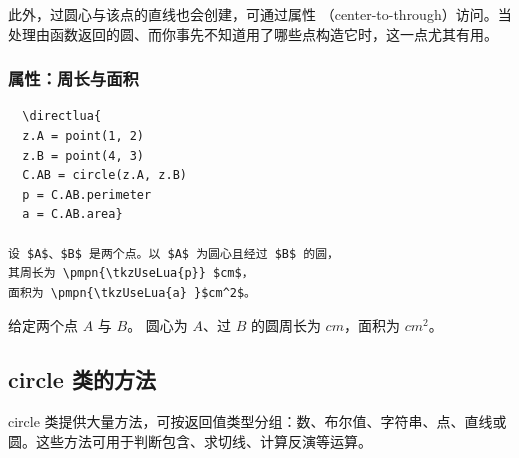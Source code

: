 \medskip

此外，过圆心与该点的直线也会创建，可通过属性 （center-to-through）访问。当处理由函数返回的圆、而你事先不知道用了哪些点构造它时，这一点尤其有用。

\vspace{1em}

\begin{tkzexample}[latex=7cm]
\begin{center}
\end{center}
\end{tkzexample}


\subsubsection{属性：周长与面积}
\label{ssub:attributes_perimeter_and_area}

 \let\pmpn\pgfmathprintnumber

\begin{mybox}
\begin{verbatim}
  \directlua{
  z.A = point(1, 2)
  z.B = point(4, 3)
  C.AB = circle(z.A, z.B)
  p = C.AB.perimeter
  a = C.AB.area}

设 $A$、$B$ 是两个点。以 $A$ 为圆心且经过 $B$ 的圆，
其周长为 \pmpn{\tkzUseLua{p}} $cm$，
面积为 \pmpn{\tkzUseLua{a} }$cm^2$。
\end{verbatim}
\end{mybox}


给定两个点 $A$ 与 $B$。
圆心为 $A$、过 $B$ 的圆周长为 \pmpn{\tkzUseLua{p}} $cm$，面积为 \pmpn{\tkzUseLua{a} }$cm^2$。


\newpage
\subsection{circle 类的方法}
circle 类提供大量方法，可按返回值类型分组：数、布尔值、字符串、点、直线或圆。这些方法可用于判断包含、求切线、计算反演等运算。

